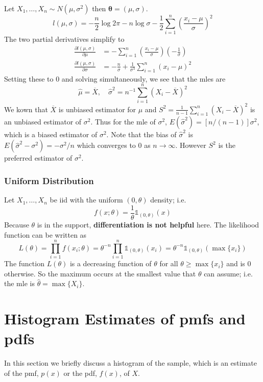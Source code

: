 Let $X_1,\dots,X_n\sim N(\mu,\sigma^{2})$ then $\boldsymbol{\theta}=(\mu,\sigma)$.
\[
l(\mu,\sigma)=-\frac{n}{2}\log2\pi-n\log\sigma-\frac{1}{2}\sum_{i=1}^{n} \left( \frac{x_i-\mu}{\sigma} \right)^{2}
\]
The two partial derivatives simplify to
\[
\begin{aligned}
\frac{ \partial l(\mu,\sigma) }{ \partial \mu }&=-\sum_{i=1}^{n} \left( \frac{x_i-\mu}{\sigma} \right)\left( -\frac{1}{\sigma}  \right) \\
\frac{ \partial l(\mu,\sigma) }{ \partial \sigma }  & =-\frac{n}{\sigma}+\frac{1}{\sigma^{3}}\sum_{i=1}^{n} (x_i-\mu)^{2}   
\end{aligned}
\]
Setting these to 0 and solving simultaneously, we see that the mles are
\[
\hat{\mu}=\overline{X},\quad \hat{\sigma}^{2}=n^{-1}\sum_{i=1}^{n} (X_i-\overline{X})^{2}
\]
We kown that $\overline{X}$ is unbiased estimator for $\mu$ and $S^{2}=\frac{1}{n-1}\sum_{i=1}^{n}(X_i-\overline{X})^{2}$ is an unbiased estimator of $\sigma^{2}$. Thus for the mle of $\sigma^{2}$, $E(\hat{\sigma}^{2})=[n/(n-1)]\sigma^{2}$, which is a biased estimator of $\sigma^{2}$. Note that the bias of $\hat{\sigma}^{2}$ is $E(\hat{\sigma}^{2}-\sigma^{2})=-\sigma^{2}/n$ which converges to 0 as $n\to \infty$. However $S^{2}$ is the preferred estimator of $\sigma^{2}$.

\subsubsection{Uniform Distribution}

Let $X_1,\dots,X_n$ be iid with the uniform $(0,\theta)$ density; i.e.
\[
f(x;\theta)=\frac{1}{\theta}\mathbb{1}_{(0,\theta)}(x) 
\]
Because $\theta$ is in the support, \textbf{differentiation is not helpful} here. The likelihood function can be written as
\[
L(\theta)=\prod_{i=1}^{n} f(x_i;\theta)=\theta^{-n}\prod_{i=1}^{n} \mathbb{1}_{(0,\theta)}(x_i)=\theta^{-n}\mathbb{1}_{(0,\theta)}(\max\{ x_i \})
\]
The function $L(\theta)$ is a decreasing function of $\theta$ for all $\theta\geq \max\{ x_i \}$ and is $0$ otherwise. So the maximum occurs at the smallest value that $\theta$ can assume; i.e. the mle is $\hat{\theta}=\max\{ X_i \}$.

\section{Histogram Estimates of pmfs and pdfs}

In this section we briefly discuss a histogram of the sample, which is an estimate of the pmf, $p(x)$ or the pdf, $f(x)$, of $X$.

